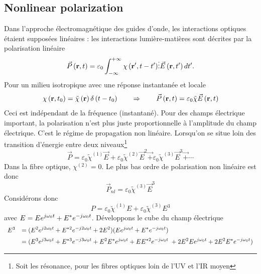 \subsection{Nonlinear polarization}
Dans l'approche électromagnétique des guides d'onde, les interactions optiques étaient supposées
linéaires : les interactions lumière-matières sont décrites par la polarisation linéaire
\begin{equation}
\vec{P}\left( {{\bf{r}},t} \right) = {\varepsilon _0}\int_{ - \infty }^{ + \infty } {\chi \left( {{\bf{r}}',t - t'} \right)}  \vdots \vec{E}\left( {{\bf{r}},t'} \right)dt'.
\end{equation}
Pour un milieu isotropique avec une réponse instantanée et locale
\begin{equation}
\chi \left( {{\bf{r}},{t_0}} \right) = \tilde \chi \left( {\bf{r}} \right)\delta \left( {t - {t_0}} \right)\qquad\Rightarrow\qquad \vec{P}\left( {{\bf{r}},t} \right) = {\varepsilon _0}\tilde \chi \vec{E}\left( {{\bf{r}},t} \right)
\end{equation}
Ceci est indépendant de la fréquence (instantané). Pour des champs électrique important, la
polarisation n'est plus juste proportionnelle à l'amplitude du champ électrique. C'est le 
régime de propagation non linéaire. Lorsqu'on se situe loin des transition d'énergie entre
deux niveaux\footnote{Soit les résonance, pour les fibres optiques loin de l'UV et l'IR moyen}
\begin{equation}
\vec{P} = {\varepsilon _0}{\tilde \chi ^{(1)}}\vec{E} + {\varepsilon _0}{\tilde \chi ^{(2)}}{\vec{E}^2}\vec{ + }{\varepsilon _0}{\tilde \chi ^{(3)}}{\vec{E}^3}\vec{ + } \cdots 
\end{equation}
Dans la fibre optique, $\chi^{(2)}=0$. Le plus bas ordre de polarisation non linéaire est donc
\begin{equation}
{\vec{P}_{nl}} = {\varepsilon _0}{\tilde \chi ^{(3)}}{\vec{E}^3}
\end{equation}
Considérons donc 
\begin{equation}
P = {\varepsilon _0}{\tilde \chi ^{(1)}}E + {\varepsilon _0}{\tilde \chi ^{(3)}}{E^3}
\end{equation}
avec $\displaystyle E = E{e^{j{\omega _0}t}} + {E^*}{e^{ - j{\omega _0}t}} $. Développons le cube du champ
 électrique
\begin{equation}
\begin{array}{ll}
{E^3} &\DS= ({E^2}{e^{j2{\omega _0}t}} + {E^{*2}}{e^{ - j2{\omega _0}t}} + 2E{^2})(E{e^{j{\omega _0}t}} + {E^*}{e^{ - j{\omega _0}t}})\vspace{2mm}\\
&\DS= ({E^3}{e^{j3{\omega _0}t}} + {E^{*3}}{e^{ - j3{\omega _0}t}} + {E^2}{E^*}{e^{j{\omega _0}t}} + E{E^{*2}}{e^{ - j{\omega _0}t}}\; + 2E{^2}E{e^{j{\omega _0}t}} + 2E{^2}{E^*}{e^{ - j{\omega _0}t}})
\end{array}
\end{equation}
